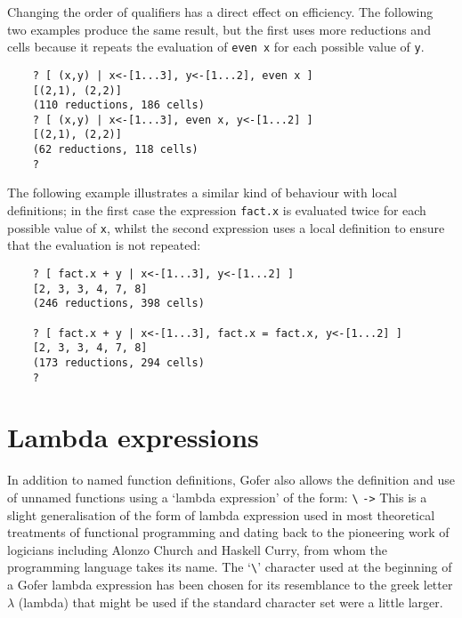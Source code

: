 \IT  Changing  the  order  of  qualifiers  has  a  direct   effect   on
     efficiency.  The following two examples produce the  same  result,
     but the first uses more reductions and cells  because  it  repeats
     the evaluation of \verb"even x" for each possible value of \verb"y".
\begin{verbatim}
    ? [ (x,y) | x<-[1...3], y<-[1...2], even x ]
    [(2,1), (2,2)]
    (110 reductions, 186 cells)
    ? [ (x,y) | x<-[1...3], even x, y<-[1...2] ]
    [(2,1), (2,2)]
    (62 reductions, 118 cells)
    ? 
\end{verbatim}
     The following example illustrates a similar kind of behaviour with
     local definitions; in the first case the expression  \verb"fact.x"  is
     evaluated twice for each possible value of \verb"x", whilst the  second
     expression uses a local definition to ensure that  the  evaluation
     is not repeated:
\begin{verbatim}
    ? [ fact.x + y | x<-[1...3], y<-[1...2] ]
    [2, 3, 3, 4, 7, 8]
    (246 reductions, 398 cells)

    ? [ fact.x + y | x<-[1...3], fact.x = fact.x, y<-[1...2] ]
    [2, 3, 3, 4, 7, 8]
    (173 reductions, 294 cells)
    ?
\end{verbatim}
\EI

\section{Lambda expressions}
In addition to  named  function  definitions,  Gofer  also  allows  the
definition and use of unnamed functions using a `lambda expression'  of
the form:
\BQ
    \verb"\"  \verb"->" 
\EQ
This  is  a  slight  generalisation  of  the  form  of  lambda
expression  used  in  most   theoretical   treatments   of   functional
programming and  dating  back  to  the  pioneering  work  of  logicians
including Alonzo Church and Haskell Curry, from whom the programming language
takes its name.  The `\verb"\"' character used at the  beginning  of  a  Gofer
lambda expression has been chosen for  its  resemblance  to  the  greek
letter $\lambda$ (lambda)
that might be used if the standard character set  were  a
little larger.

